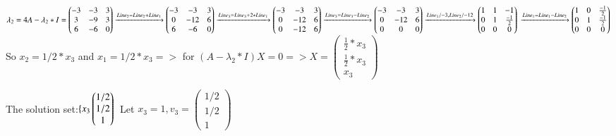 \documentclass{article}
\begin{document}
$\lambda_2=4\\
A-\lambda_2*I=\left(\begin{matrix}
-3 & -3 & 3 \\
3 & -9 & 3 \\
6 & -6 & 0
\end{matrix}\right)\xrightarrow{Line_2=Line_2 + Line_1}
\left(\begin{matrix}
-3 & -3 & 3  \\
0 & -12 & 6  \\
6 & -6 & 0
\end{matrix}\right)\xrightarrow{Line_3=Line_3 + 2*Line_1}
\left(\begin{matrix}
-3 & -3 & 3  \\
0 & -12 & 6  \\
0 & -12 & 6
\end{matrix}\right)\xrightarrow{Line_3=Line_3 -Line_2}
\left(\begin{matrix}
-3 & -3 & 3  \\
0 & -12 & 6  \\
0 & 0 & 0\end{matrix}\right)\xrightarrow{Line_1/-3,Line_2/-12}
\left(\begin{matrix}
1 & 1 & -1  \\
0 & 1 & \frac{-1}{2} \\
0 & 0 & 0 
\end{matrix}\right)\\ \xrightarrow{Line_1=Line_1 -Line_2}
\left(\begin{matrix}
1 & 0 & \frac{-1}{2} \\
0 & 1 & \frac{-1}{2} \\
0 & 0 & 0
\end{matrix}\right)\\
$
So $x_2=1/2*x_3$ and $x_1=1/2*x_3 =>$
for $(A-\lambda_2*I)X=0=>X=\left(\begin{matrix}
\frac{1}{2}*x_3 \\
\frac{1}{2}*x_3 \\
x_3
\end{matrix}\right)$

The solution set:$\{x_3\left(\begin{matrix}1/2 \\ 1/2 \\                     1\end{matrix}\right)\\$
Let $x_3=1, v_3=\left(\begin{matrix}1/2 \\ 1/2 \\ 1\end{matrix}\right)$
\end{document}
